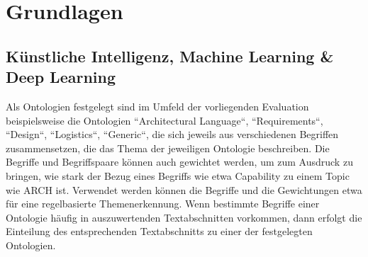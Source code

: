 \chapter{Grundlagen}
\label{grundlagen}



\section{Künstliche Intelligenz, Machine Learning \& Deep Learning}


Als Ontologien festgelegt sind im Umfeld der vorliegenden Evaluation beispielsweise die Ontologien ``Architectural Language``, ``Requirements``, ``Design``, ``Logistics``, ``Generic``, die sich jeweils aus verschiedenen Begriffen zusammensetzen, die das Thema der jeweiligen Ontologie beschreiben. Die Begriffe und Begriffspaare können auch gewichtet werden, um zum Ausdruck zu bringen, wie stark der Bezug eines Begriffs wie etwa Capability zu einem Topic wie ARCH ist. Verwendet werden können die Begriffe und die Gewichtungen etwa für eine regelbasierte Themenerkennung. Wenn bestimmte Begriffe einer Ontologie häufig in auszuwertenden Textabschnitten vorkommen, dann erfolgt die Einteilung des entsprechenden Textabschnitts zu einer der festgelegten Ontologien. 
